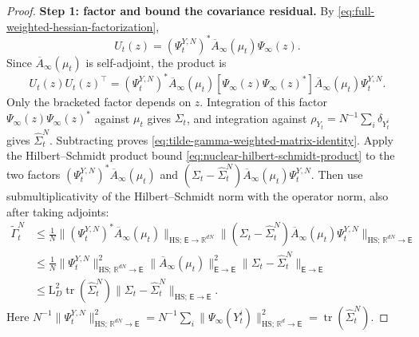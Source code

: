 \begin{proof}
\noindent\textbf{Step 1: factor and bound the covariance residual.}
By \eqref{eq:full-weighted-hessian-factorization},
\[
 U_t(z)=(\Psi_t^{Y,N})^*\overline A_\infty(\mu_t)\Psi_\infty(z).
\]
Since $\overline A_\infty(\mu_t)$ is self-adjoint, the product is
\[
 U_t(z)U_t(z)^\top
 =(\Psi_t^{Y,N})^*\overline A_\infty(\mu_t)
 [\Psi_\infty(z)\Psi_\infty(z)^*]
 \overline A_\infty(\mu_t)\Psi_t^{Y,N}.
\]
Only the bracketed factor depends on $z$. Integration of this factor
$\Psi_\infty(z)\Psi_\infty(z)^*$ against $\mu_t$ gives $\Sigma_t$,
and integration against $\rho_{Y_t}=N^{-1}\sum_i\delta_{Y_t^i}$ gives
$\widehat\Sigma_t^N$. Subtracting proves
\eqref{eq:tilde-gamma-weighted-matrix-identity}.
Apply the Hilbert--Schmidt product bound
\eqref{eq:nuclear-hilbert-schmidt-product} to the two factors
$(\Psi_t^{Y,N})^*\overline A_\infty(\mu_t)$ and
$(\Sigma_t-\widehat\Sigma_t^N)\overline A_\infty(\mu_t)\Psi_t^{Y,N}$.
Then use submultiplicativity of the Hilbert--Schmidt norm with the
operator norm, also after taking adjoints:
\[
\begin{aligned}
 \widetilde\Gamma_t^N
 &\le\frac1N\|(\Psi_t^{Y,N})^*\overline A_\infty(\mu_t)\|_{\mathrm{HS};\,\mathsf E\to\mathbb R^{dN}}
 \|(\Sigma_t-\widehat\Sigma_t^N)\overline A_\infty(\mu_t)
                              \Psi_t^{Y,N}\|_{\mathrm{HS};\,\mathbb R^{dN}\to\mathsf E}\\
 &\le\frac1N\|\Psi_t^{Y,N}\|_{\mathrm{HS};\,\mathbb R^{dN}\to\mathsf E}^2
       \|\overline A_\infty(\mu_t)\|_{\mathsf E\to\mathsf E}^2
       \|\Sigma_t-\widehat\Sigma_t^N\|_{\mathsf E\to\mathsf E}\\
 &\le\mathrm L_D^2\operatorname{tr}(\widehat\Sigma_t^N)
       \|\Sigma_t-\widehat\Sigma_t^N\|_{\mathrm{HS};\,\mathsf E\to\mathsf E}.
\end{aligned}
\]
Here $N^{-1}\|\Psi_t^{Y,N}\|_{\mathrm{HS};\,\mathbb R^{dN}\to\mathsf E}^2
=N^{-1}\sum_i\|\Psi_\infty(Y_t^i)\|_{\mathrm{HS};\,\mathbb R^d\to\mathsf E}^2
=\operatorname{tr}(\widehat\Sigma_t^N)$.


\end{proof}
